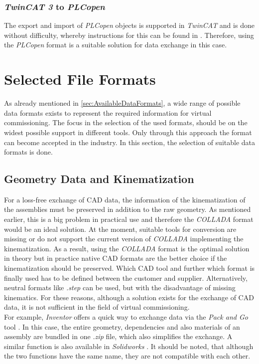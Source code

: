 \subsubsection*{\textit{TwinCAT 3} to \textit{PLCopen}}
    The export and import of \textit{PLCopen} objects is supported in \textit{TwinCAT} and is done without difficulty, whereby instructions for this can be found in \cite{TwincatExportPlcopen}. Therefore, using the \textit{PLCopen} format is a suitable solution for data exchange in this case. 



\section{Selected File Formats}
    As already mentioned in \autoref{sec:AvailableDataFormats}, a wide range of possible data formats exists to represent the required information for virtual commissioning. The focus in the selection of the used formats, should be on the widest possible support in different tools. Only through this approach the format can become accepted in the industry. In this section, the selection of suitable data formats is done.
   
    
    \subsection{Geometry Data and Kinematization}
    For a loss-free exchange of CAD data, the information of the kinematization of the assemblies must be preserved in addition to the raw geometry. As mentioned earlier, this is a big problem in practical use and therefore the \textit{COLLADA} format would be an ideal solution. At the moment, suitable tools for conversion are missing or do not support the current version of \textit{COLLADA} implementing the kinematization. As a result, using the \textit{COLLADA} format is the optimal solution in theory but in practice native CAD formats are the better choice if the kinematization should be preserved. Which CAD tool and further which format is finally used has to be defined between the customer and supplier. Alternatively, neutral formats like \textit{.step} can be used, but with the disadvantage of missing kinematics. For these reasons, although a solution exists for the exchange of CAD data, it is not sufficient in the field of virtual commissioning. \\
    
    For example, \textit{Inventor} offers a quick way to exchange data via the \textit{Pack and Go} tool \cite{InventorPackAndGo}. In this case, the entire geometry, dependencies and also materials of an assembly are bundled in one \textit{.zip} file, which also simplifies the exchange. A similar function is also available in \textit{Solidworks} \cite{SolidworksPackAndGo}. It should be noted, that although the two functions have the same name, they are not compatible with each other. \\
    
